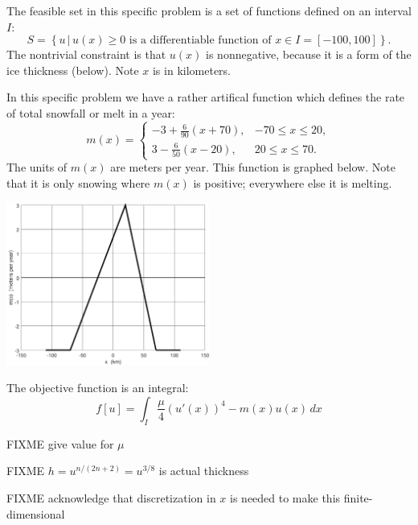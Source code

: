 \documentclass[11pt]{amsart}
\begin{document}
\begin{enumerate}
The feasible set in this specific problem is a set of functions defined on an interval $I$:
    $$S = \left\{u \,\big|\, u(x) \ge 0 \text{ is a differentiable function of } x\in I = [-100,100]\right\}.$$
The nontrivial constraint is that $u(x)$ is nonnegative, because it is a form of the ice thickness (below).  Note $x$ is in kilometers.

In this specific problem we have a rather artifical function which defines the rate of total snowfall or melt in a year:
    $$m(x) = \begin{cases} -3 + \frac{6}{90} (x+70), & -70 \le x \le 20, \\
                            3 - \frac{6}{50} (x-20), & 20 \le x \le 70.
             \end{cases}$$
The units of $m(x)$ are meters per year.  This function is graphed below.  Note that it is only snowing where $m(x)$ is positive; everywhere else it is melting.

\bigskip
\begin{center}
\includegraphics[width=0.5\textwidth]{massbalance}
\end{center}

The objective function is an integral:
    $$f[u] = \int_I \frac{\mu}{4} \left(u'(x)\right)^4 - m(x) u(x)\,dx$$

FIXME give value for $\mu$

FIXME $h=u^{n/(2n+2)} = u^{3/8}$ is actual thickness

FIXME acknowledge that discretization in $x$ is needed to make this finite-dimensional

\end{enumerate}
\end{document}
